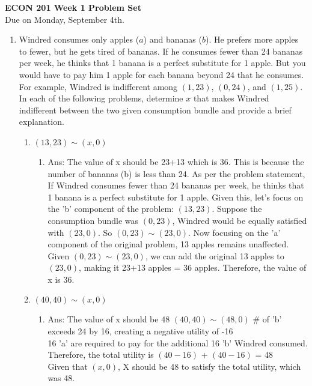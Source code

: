 \documentclass[11pt]{article}
\begin{document}
\begin{center}
\textbf{ECON 201 Week 1 Problem Set}\\
Due on Monday, September 4th.
\end{center}

\begin{enumerate}
\item Windred consumes only apples ($a$) and bananas ($b$). He prefers more apples to fewer, but he gets tired of bananas. If he consumes fewer than 24 bananas per week, he thinks that 1 banana is a perfect substitute for 1 apple. But you would have to pay him 1 apple for each banana beyond 24 that he consumes. For example, Windred is indifferent among $(1,23)$, $(0,24)$, and $(1,25)$. In each of the following problems, determine $x$ that makes Windred indifferent between the two given consumption bundle and provide a brief explanation.
    \begin{enumerate}
        \item $(13,23)\sim (x,0)$
        \begin{enumerate}
            \item Ans: The value of x should be 23+13 which is 36. This is because the number of bananas (b) is less than 24. As per the problem statement, If Windred consumes fewer than 24 bananas per week, he thinks that 1 banana is a perfect substitute for 1 apple. Given this, let's focus on the 'b' component of the problem: $(13,23)$. Suppose the consumption bundle was $(0,23)$, Windred would be equally satisfied with $(23,0)$. So $(0,23)\sim (23,0)$.
            Now focusing on the 'a' component of the original problem, 13 apples remains unaffected. Given $(0,23)\sim (23,0)$, we can add the original 13 apples to $(23,0)$, making it 23+13 apples = 36 apples. Therefore, the value of x is 36. 
        \end{enumerate}
        \item $(40,40)\sim (x,0)$
        \begin{enumerate}
            \item Ans: The value of x should be 48
            $(40,40)\sim (48,0)$
            # of 'b' exceeds 24 by 16, creating a negative utility of -16
            \\16 'a' are required to pay for the additional 16 'b' Windred consumed. Therefore, the total utility is $(40-16)$ + $(40-16)$ = 48
            \\Given that $(x, 0)$, X should be 48 to satisfy the total utility, which was 48.
        \end{enumerate}

\end{enumerate}
\end{enumerate}
\end{document}
